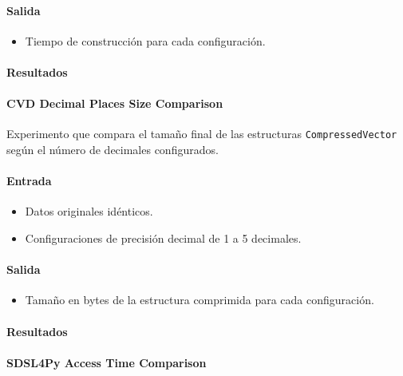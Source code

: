\paragraph{Salida}
\begin{itemize}
    \item Tiempo de construcción para cada configuración.
\end{itemize}

\paragraph{Resultados}
\vspace{0.5em}
\noindent

\CVDDecimalPlacesBuildTimeComparison
\newpage

\paragraph{CVD Decimal Places Size Comparison}
\label{cvd_decimal_places_size}

Experimento que compara el tamaño final de las estructuras \texttt{CompressedVector} según el número de decimales configurados.

\paragraph{Entrada}
\begin{itemize}
    \item Datos originales idénticos.
    \item Configuraciones de precisión decimal de 1 a 5 decimales.
\end{itemize}

\paragraph{Salida}
\begin{itemize}
    \item Tamaño en bytes de la estructura comprimida para cada configuración.
\end{itemize}

\paragraph{Resultados}
\vspace{0.5em}
\noindent

\CVDDecimalPlacesSizeComparison
\newpage

\paragraph{SDSL4Py Access Time Comparison}
\label{sdsl4py_access_time}

